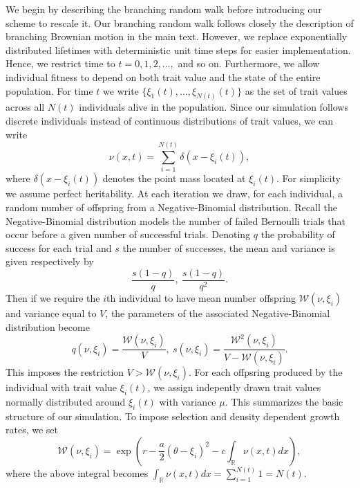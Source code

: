\documentclass[]{article}
\begin{document}
We begin by describing the branching random walk before introducing our
scheme to rescale it. Our branching random walk follows closely the
description of branching Brownian motion in the main text. However, we
replace exponentially distributed lifetimes with deterministic unit time
steps for easier implementation. Hence, we restrict time to
\(t=0,1,2,\dots,\) and so on. Furthermore, we allow individual fitness
to depend on both trait value and the state of the entire population.
For time \(t\) we write \(\{\xi_1(t),\dots,\xi_{N(t)}(t)\}\) as the set
of trait values across all \(N(t)\) individuals alive in the population.
Since our simulation follows discrete individuals instead of continuous
distributions of trait values, we can write \begin{equation}
\nu(x,t)=\sum_{i=1}^{N(t)}\delta(x-\xi_i(t)),
\end{equation} where \(\delta(x-\xi_i(t))\) denotes the point mass
located at \(\xi_i(t)\). For simplicity we assume perfect heritability.
At each iteration we draw, for each individual, a random number of
offspring from a Negative-Binomial distribution. Recall the
Negative-Binomial distribution models the number of failed Bernoulli
trials that occur before a given number of successful trials. Denoting
\(q\) the probability of success for each trial and \(s\) the number of
successes, the mean and variance is given respectively by
\begin{equation}
\frac{s(1-q)}{q}, \ \frac{s(1-q)}{q^2}.
\end{equation} Then if we require the \(i\)th individual to have mean
number offspring \(\mathscr W(\nu,\xi_i)\) and variance equal to \(V\),
the parameters of the associated Negative-Binomial distribution become
\begin{equation}
q(\nu,\xi_i)=\frac{\mathscr{W}(\nu,\xi_i)}{V}, \ s(\nu,\xi_i)=\frac{\mathscr{W}^2(\nu,\xi_i)}{V-\mathscr{W}(\nu,\xi_i)}.
\end{equation} This imposes the restriction
\(V>\mathscr{W}(\nu,\xi_i)\). For each offpsring produced by the
individual with trait value \(\xi_i(t)\), we assign indepently drawn
trait values normally distributed around \(\xi_i(t)\) with variance
\(\mu\). This summarizes the basic structure of our simulation. To
impose selection and density dependent growth rates, we set
\begin{equation}
\mathscr{W}(\nu,\xi_i)=\exp\left(r-\frac{a}{2}(\theta-\xi_i)^2-c\int_\mathbb{R}\nu(x,t)dx\right),
\end{equation} where the above integral becomes
\(\int_\mathbb{R}\nu(x,t)dx=\sum_{i=1}^{N(t)}1=N(t)\).
\end{document}
